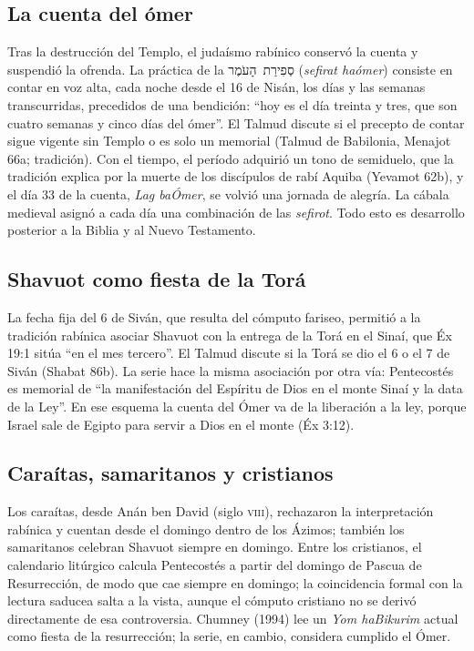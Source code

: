 \documentclass[11pt,letterpaper]{article}
\newcommand{\heb}[1]{\mbox{\foreignlanguage{hebrew}{#1}}}
\begin{document}
\subsection{La cuenta del ómer}
Tras la destrucción del Templo, el judaísmo rabínico conservó la cuenta y suspendió la ofrenda. La práctica de la \heb{סְפִירַת הָעֹמֶר} (\emph{sefirat haómer}) consiste en contar en voz alta, cada noche desde el 16 de Nisán, los días y las semanas transcurridas, precedidos de una bendición: ``hoy es el día treinta y tres, que son cuatro semanas y cinco días del ómer''. El Talmud discute si el precepto de contar sigue vigente sin Templo o es solo un memorial (Talmud de Babilonia, Menajot 66a; tradición). Con el tiempo, el período adquirió un tono de semiduelo, que la tradición explica por la muerte de los discípulos de rabí Aquiba (Yevamot 62b), y el día 33 de la cuenta, \emph{Lag baÓmer}, se volvió una jornada de alegría. La cábala medieval asignó a cada día una combinación de las \emph{sefirot}. Todo esto es desarrollo posterior a la Biblia y al Nuevo Testamento.

\subsection{Shavuot como fiesta de la Torá}
La fecha fija del 6 de Siván, que resulta del cómputo fariseo, permitió a la tradición rabínica asociar Shavuot con la entrega de la Torá en el Sinaí, que Éx 19:1 sitúa ``en el mes tercero''. El Talmud discute si la Torá se dio el 6 o el 7 de Siván (Shabat 86b). La serie hace la misma asociación por otra vía: Pentecostés es memorial de ``la manifestación del Espíritu de Dios en el monte Sinaí y la data de la Ley''. En ese esquema la cuenta del Ómer va de la liberación a la ley, porque Israel sale de Egipto para servir a Dios en el monte (Éx 3:12).

\subsection{Caraítas, samaritanos y cristianos}
Los caraítas, desde Anán ben David (siglo \textsc{viii}), rechazaron la interpretación rabínica y cuentan desde el domingo dentro de los Ázimos; también los samaritanos celebran Shavuot siempre en domingo. Entre los cristianos, el calendario litúrgico calcula Pentecostés a partir del domingo de Pascua de Resurrección, de modo que cae siempre en domingo; la coincidencia formal con la lectura saducea salta a la vista, aunque el cómputo cristiano no se derivó directamente de esa controversia. Chumney (1994) lee un \emph{Yom haBikurim} actual como fiesta de la resurrección; la serie, en cambio, considera cumplido el Ómer.
\end{document}

